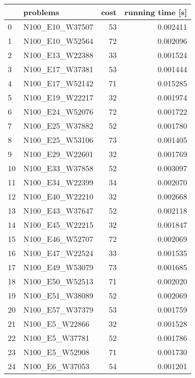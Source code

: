 \begin{table}
\centering
\begin{tabular}{llrr}
\toprule
{} &            problems &  cost &  running time [s] \\
\midrule
0  &     N100\_E10\_W37507 &    53 &          0.002411 \\
1  &     N100\_E10\_W52564 &    72 &          0.002096 \\
2  &     N100\_E13\_W22388 &    33 &          0.001524 \\
3  &     N100\_E17\_W37381 &    53 &          0.001444 \\
4  &     N100\_E17\_W52142 &    71 &          0.015285 \\
5  &     N100\_E19\_W22217 &    32 &          0.001974 \\
6  &     N100\_E24\_W52076 &    72 &          0.001722 \\
7  &     N100\_E25\_W37882 &    52 &          0.001780 \\
8  &     N100\_E25\_W53106 &    73 &          0.001405 \\
9  &     N100\_E29\_W22601 &    32 &          0.001769 \\
10 &     N100\_E33\_W37858 &    52 &          0.003097 \\
11 &     N100\_E34\_W22399 &    34 &          0.002070 \\
12 &     N100\_E40\_W22210 &    32 &          0.002668 \\
13 &     N100\_E43\_W37647 &    52 &          0.002118 \\
14 &     N100\_E45\_W22215 &    32 &          0.001847 \\
15 &     N100\_E46\_W52707 &    72 &          0.002069 \\
16 &     N100\_E47\_W22524 &    33 &          0.001535 \\
17 &     N100\_E49\_W53079 &    73 &          0.001685 \\
18 &     N100\_E50\_W52513 &    71 &          0.002020 \\
19 &     N100\_E51\_W38089 &    52 &          0.002069 \\
20 &     N100\_E57\_W37379 &    53 &          0.001759 \\
21 &      N100\_E5\_W22866 &    32 &          0.001528 \\
22 &      N100\_E5\_W37781 &    52 &          0.001786 \\
23 &      N100\_E5\_W52908 &    71 &          0.001730 \\
24 &      N100\_E6\_W37053 &    54 &          0.001201 \\

\end{tabular}
\end{table}
